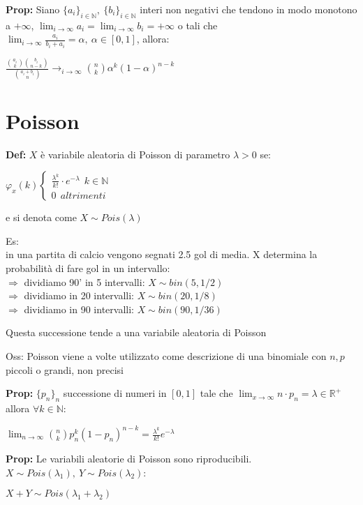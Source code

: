 \documentclass[12pt, a4paper]{article}
\begin{document}
\newpage
{}

\textbf{Prop:} Siano $\{a_{i}\}_{i\in\mathbb{N}},\ \{b_{i}\}_{i\in\mathbb{N}}$ interi non negativi che tendono
in modo monotono a $+\infty$, $\lim_{i \to \infty} a_{i}=\lim_{i\to\infty} b_{i}=+\infty$ o tali che \\
$\lim_{i\to\infty} \frac{a_{i}}{b_{i}+a_{i}}= \alpha,\ \alpha\in[0,1]$, allora:
\begin{center}
    $\frac{\binom{a_{i}}{k}\binom{b_{i}}{n-k}}{\binom{a_{i}+b_{i}}{n}} \rightarrow_{i\to\infty}
    \binom{n}{k}\alpha^{k}(1-\alpha)^{n-k}$
\end{center}

\section{Poisson}
\textbf{Def:} $X$ è variabile aleatoria di Poisson di parametro $\lambda >0$ se:
\begin{center}
    $\varphi_{x}(k)\begin{cases}
        \frac{\lambda^{k}}{k!}\cdot e^{-\lambda}\ \ k\in\mathbb{N}\\
        0\ \ altrimenti
    \end{cases}$
\end{center} 
e si denota come $X\sim Pois(\lambda)$

Es:\\
in una partita di calcio vengono segnati 2.5 gol di media. X determina la probabilità di fare gol in un intervallo:\\
$\Rightarrow$ dividiamo 90' in 5 intervalli: $X\sim bin(5,1/2)$\\
$\Rightarrow$ dividiamo in 20 intervalli: $X\sim bin(20,1/8)$\\
$\Rightarrow$ dividiamo in 90 intervalli: $X\sim bin(90,1/36)$

Questa successione tende a una variabile aleatoria di Poisson

Oss: Poisson viene a volte utilizzato come descrizione di una binomiale con $n,p$ piccoli o grandi, non precisi

\textbf{Prop:} $\{p_{n}\}_{n}$ successione di numeri in $[0,1]$ tale che $\lim_{x\to\infty}n\cdot p_{n}=
\lambda\in\mathbb{R}^{+}$ allora $\forall k\in\mathbb{N}$:
\begin{center}
    $\lim_{n\to\infty} \binom{n}{k}p_{n}^{k}(1-p_{n})^{n-k}=\frac{\lambda^{k}}{k!}e^{-\lambda}$
\end{center}

\newpage
\textbf{Prop:} Le variabili aleatorie di Poisson sono riproducibili. 
$X\sim Pois(\lambda_{1}),\ Y\sim Pois(\lambda_{2})$:
\begin{center}
    $X+Y\sim Pois(\lambda_{1}+\lambda_{2})$
\end{center}
\end{document}
